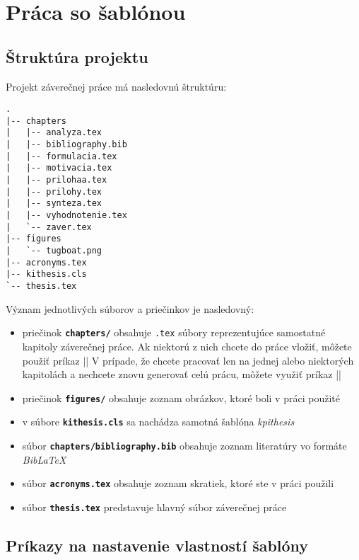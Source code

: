 \chapter{Práca so šablónou}
\label{ch:sablona}

\section{Štruktúra projektu}

Projekt záverečnej práce má nasledovnú štruktúru:

\begin{verbatim}
.
|-- chapters
|   |-- analyza.tex
|   |-- bibliography.bib
|   |-- formulacia.tex
|   |-- motivacia.tex
|   |-- prilohaa.tex
|   |-- prilohy.tex
|   |-- synteza.tex
|   |-- vyhodnotenie.tex
|   `-- zaver.tex
|-- figures
|   `-- tugboat.png
|-- acronyms.tex
|-- kithesis.cls
`-- thesis.tex
\end{verbatim}

Význam jednotlivých súborov a priečinkov je nasledovný:

\begin{itemize}
    \item priečinok {\tt \bf{chapters/}} obsahuje {\tt .tex} súbory reprezentujúce samostatné kapitoly záverečnej práce. Ak niektorú z nich chcete do práce vložiť, môžete použiť príkaz || V prípade, že chcete pracovať len na jednej alebo niektorých kapitolách a nechcete znovu generovať celú prácu, môžete využiť príkaz ||
    \item priečinok {\tt \bf{figures/}} obsahuje zoznam obrázkov, ktoré boli v práci použité
    \item v súbore {\tt \bf{kithesis.cls}} sa nachádza samotná šablóna \emph{kpithesis}
    \item súbor {\tt \bf{chapters/bibliography.bib}} obsahuje zoznam literatúry vo formáte \emph{BibLaTeX}
    \item súbor {\tt \bf{acronyms.tex}} obsahuje zoznam skratiek, ktoré ste v práci použili
    \item súbor {\tt \bf{thesis.tex}} predstavuje hlavný súbor záverečnej práce
\end{itemize}


\section{Príkazy na nastavenie vlastností šablóny}

